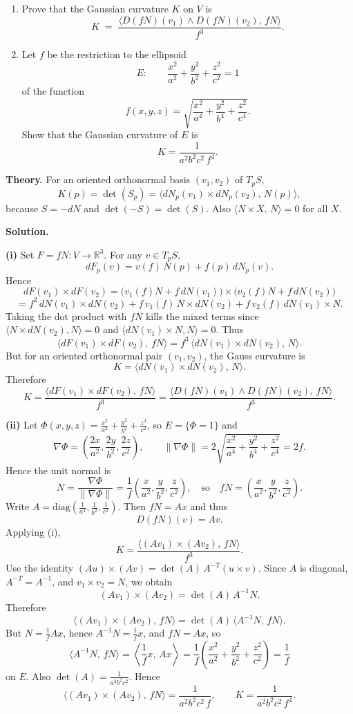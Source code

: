 \documentclass[12pt,a4paper]{article}
\theoremstyle{plain}
\theoremstyle{definition}      %
\begin{document}
	\begin{enumerate}
		\item Prove that the Gaussian curvature $K$ on $V$ is
		\[
		K \;=\; \frac{\big\langle D(fN)(v_1)\wedge D(fN)(v_2),\, fN\big\rangle}{f^3}.
		\]
		\item Let $f$ be the restriction to the ellipsoid
		\[
		E:\qquad \frac{x^2}{a^2}+\frac{y^2}{b^2}+\frac{z^2}{c^2}=1
		\]
		of the function
		\[
		f(x,y,z)=\sqrt{\frac{x^2}{a^4}+\frac{y^2}{b^4}+\frac{z^2}{c^4}}.
		\]
		Show that the Gaussian curvature of $E$ is
		\[
		K=\frac{1}{a^2b^2c^2\, f^4}.
		\]
	\end{enumerate}
	
	\medskip
	\textbf{Theory.}
	For an oriented orthonormal basis $(v_1,v_2)$ of $T_pS$,
	\[
	K(p)=\det(S_p)=\big\langle dN_p(v_1)\times dN_p(v_2),\,N(p)\big\rangle,
	\]
	because $S=-dN$ and $\det(-S)=\det(S)$. Also $\langle N\times X,\,N\rangle=0$ for all $X$.
	
	\medskip
	\textbf{Solution.}
	
	\textbf{(i)} Set $F=fN:V\to\mathbb R^3$. For any $v\in T_pS$,
	\[
	dF_p(v)=v(f)\,N(p)+f(p)\,dN_p(v).
	\]
	Hence
	\[
	dF(v_1)\times dF(v_2)
	=
	\big(v_1(f)N+f\,dN(v_1)\big)\times\big(v_2(f)N+f\,dN(v_2)\big)
	\]
	\[
	= f^2\,dN(v_1)\times dN(v_2)
	+ f\,v_1(f)\,N\times dN(v_2)
	+ f\,v_2(f)\,dN(v_1)\times N.
	\]
	Taking the dot product with $fN$ kills the mixed terms since
	$\langle N\times dN(v_2),N\rangle=0$ and $\langle dN(v_1)\times N,N\rangle=0$.
	Thus
	\[
	\big\langle dF(v_1)\times dF(v_2),\,fN\big\rangle
	=
	f^3\,\big\langle dN(v_1)\times dN(v_2),\,N\big\rangle.
	\]
	But for an oriented orthonormal pair $(v_1,v_2)$, the Gauss curvature is
	\[
	K=\big\langle dN(v_1)\times dN(v_2),\,N\big\rangle.
	\]
	Therefore
	\[
	K=\frac{\big\langle dF(v_1)\times dF(v_2),\,fN\big\rangle}{f^3}
	=
	\frac{\big\langle D(fN)(v_1)\wedge D(fN)(v_2),\,fN\big\rangle}{f^3}.
	\]
	
	\medskip
	\textbf{(ii)} Let $\Phi(x,y,z)=\frac{x^2}{a^2}+\frac{y^2}{b^2}+\frac{z^2}{c^2}$, so $E=\{\Phi=1\}$ and
	\[
	\nabla\Phi=\left(\frac{2x}{a^2},\frac{2y}{b^2},\frac{2z}{c^2}\right),\qquad
	\|\nabla\Phi\|=2\sqrt{\frac{x^2}{a^4}+\frac{y^2}{b^4}+\frac{z^2}{c^4}}=2f.
	\]
	Hence the unit normal is
	\[
	N=\frac{\nabla\Phi}{\|\nabla\Phi\|}=\frac1f\left(\frac{x}{a^2},\frac{y}{b^2},\frac{z}{c^2}\right),
	\quad\text{so}\quad
	fN=\left(\frac{x}{a^2},\frac{y}{b^2},\frac{z}{c^2}\right).
	\]
	Write $A=\mathrm{diag}\!\left(\frac1{a^2},\frac1{b^2},\frac1{c^2}\right)$. Then $fN=Ax$ and thus
	\[
	D(fN)(v)=Av.
	\]
	Applying (i),
	\[
	K=\frac{\langle (Av_1)\times(Av_2),\,fN\rangle}{f^3}.
	\]
	Use the identity $(Au)\times(Av)=\det(A)\,A^{-T}(u\times v)$. Since $A$ is diagonal, $A^{-T}=A^{-1}$, and
	$v_1\times v_2=N$, we obtain
	\[
	(Av_1)\times(Av_2)=\det(A)\,A^{-1}N.
	\]
	Therefore
	\[
	\langle (Av_1)\times(Av_2),\,fN\rangle
	=\det(A)\,\langle A^{-1}N,\,fN\rangle.
	\]
	But $N=\frac1f Ax$, hence $A^{-1}N=\frac1f x$, and $fN=Ax$, so
	\[
	\langle A^{-1}N,\,fN\rangle
	=\left\langle \frac1f x,\,Ax\right\rangle
	=\frac1f\left(\frac{x^2}{a^2}+\frac{y^2}{b^2}+\frac{z^2}{c^2}\right)
	=\frac1f
	\]
	on $E$. Also $\det(A)=\frac1{a^2b^2c^2}$. Hence
	\[
	\langle (Av_1)\times(Av_2),\,fN\rangle=\frac{1}{a^2b^2c^2\,f},
	\qquad
	K=\frac{1}{a^2b^2c^2\,f^4}.
	\]
	
\end{document}

